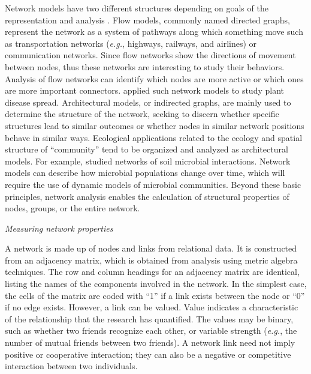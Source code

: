 \documentclass[12pt, oneside]{report}
\begin{document}
Network models have two different structures depending on goals of the representation and analysis \citep{borgatti2013analyzing}. Flow models, commonly named directed graphs, represent the network as a system of pathways along which something move such as transportation networks (\textit{e.g.}, highways, railways, and airlines) or communication networks. Since flow networks show the directions of movement between nodes, thus these networks are interesting to study their behaviors. Analysis of flow networks can identify which nodes are more active or which ones are more important connectors. \citet{Jeger:2007tn, Shaw:2014cka} applied such network models to study plant disease spread. Architectural models, or indirected graphs, are mainly used to determine the structure of the network, seeking to discern whether specific structures lead to similar outcomes or whether nodes in similar network positions behave in similar ways. Ecological applications related to the ecology and spatial structure of ``community'' tend to be organized and analyzed as architectural models. For example, \citet{Faust:2012dk} studied networks of soil microbial interactions. Network models can describe how microbial populations change over time, which will require the use of dynamic models of microbial communities. Beyond these basic principles, network analysis enables the calculation of structural properties of nodes, groups, or the entire network.

\textit{Measuring network properties}

A network is made up of nodes and links from relational data. It is constructed from an adjacency matrix, which is obtained from analysis using metric algebra techniques. The row and column headings for an adjacency matrix are identical, listing the names of the components involved in the network. In the simplest case, the cells of the matrix are coded with ``1'' if a link exists between the node or ``0'' if no edge exists. However, a link can be valued. Value indicates a characteristic of the relationship that the research has quantified. The values may be binary, such as whether two friends recognize each other, or variable strength (\textit{e.g.}, the number of mutual friends between two friends). A network link need not imply positive or cooperative interaction; they can also be a negative or competitive interaction between two individuals. 
\end{document}
